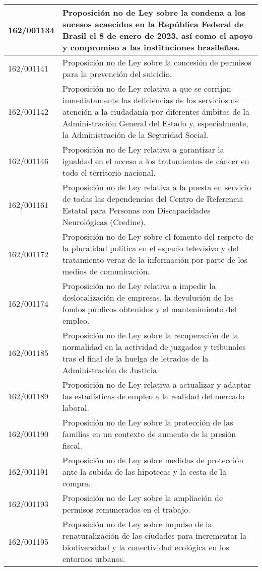 {\begin{table}[H]
\begin{center}
\begin{tabularx}{\linewidth}{| l | X |}
\hline
162/001134 & Proposición no de Ley sobre la condena a los sucesos acaecidos en la República Federal de Brasil el 8 de enero de 2023, así como el apoyo y compromiso a las instituciones brasileñas. \\
\hline
162/001141 & Proposición no de Ley sobre la concesión de permisos para la prevención del suicidio. \\
\hline
162/001142 & Proposición no de Ley relativa a que se corrijan inmediatamente las deficiencias de los servicios de atención a la ciudadanía por diferentes ámbitos de la Administración General del Estado y, especialmente, la Administración de la Seguridad Social. \\
\hline
162/001146 & Proposición no de Ley relativa a garantizar la igualdad en el acceso a los tratamientos de cáncer en todo el territorio nacional. \\
\hline
162/001161 & Proposición no de Ley relativa a la puesta en servicio de todas las dependencias del Centro de Referencia Estatal para Personas con Discapacidades Neurológicas (Credine). \\
\hline
162/001172 & Proposición no de Ley sobre el fomento del respeto de la pluralidad política en el espacio televisivo y del tratamiento veraz de la información por parte de los medios de comunicación. \\
\hline
162/001174 & Proposición no de Ley relativa a impedir la deslocalización de empresas, la devolución de los fondos públicos obtenidos y el mantenimiento del empleo. \\
\hline
162/001185 & Proposición no de Ley sobre la recuperación de la normalidad en la actividad de juzgados y tribunales tras el final de la huelga de letrados de la Administración de Justicia. \\
\hline
162/001189 & Proposición no de Ley relativa a actualizar y adaptar las estadísticas de empleo a la realidad del mercado laboral. \\
\hline
162/001190 & Proposición no de Ley sobre la protección de las familias en un contexto de aumento de la presión fiscal. \\
\hline
162/001191 & Proposición no de Ley sobre medidas de protección ante la subida de las hipotecas y la cesta de la compra. \\
\hline
162/001193 & Proposición no de Ley sobre la ampliación de permisos remunerados en el trabajo. \\
\hline
162/001195 & Proposición no de Ley sobre impulso de la renaturalización de las ciudades para incrementar la biodiversidad y la conectividad ecológica en los entornos urbanos. \\

\end{tabularx}
\end{center}
\end{table}}
